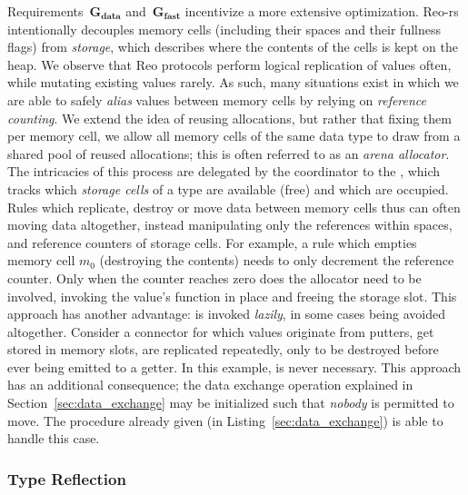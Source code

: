 Requirements~$\boldsymbol{G_{data}}$ and~$\boldsymbol{G_{fast}}$ incentivize a more extensive optimization. Reo-rs intentionally decouples memory cells (including their spaces and their fullness flags) from \textit{storage}, which describes where the contents of the cells is kept on the heap. We observe that Reo protocols perform logical replication of values often, while mutating existing values rarely. As such, many situations exist in which we are able to safely \textit{alias} values between memory cells by relying on \textit{reference counting}. We extend the idea of reusing allocations, but rather that fixing them per memory cell, we allow all memory cells of the same data type to draw from a shared pool of reused allocations; this is often referred to as an \textit{arena allocator}. The intricacies of this process are delegated by the coordinator to the , which tracks which \textit{storage cells} of a type are available (free) and which are occupied. Rules which replicate, destroy or move data between memory cells thus can often moving data altogether, instead manipulating only the references within spaces, and reference counters of storage cells. For example, a rule which empties memory cell $m_0$ (destroying the contents) needs to only decrement the reference counter. Only when the counter reaches zero does the allocator need to be involved, invoking the value's  function in place and freeing the storage slot. This approach has another advantage:  is invoked \textit{lazily}, in some cases being avoided altogether. Consider a connector for which values originate from putters, get stored in memory slots, are replicated repeatedly, only to be destroyed before ever being emitted to a getter. In this example,  is never necessary. This approach has an additional consequence; the data exchange operation explained in Section~\ref{sec:data_exchange} may be initialized such that \textit{nobody} is permitted to move. The procedure already given (in Listing~\ref{sec:data_exchange}) is able to handle this case.

\subsubsection{Type Reflection}
\label{sec:type_reflection}

